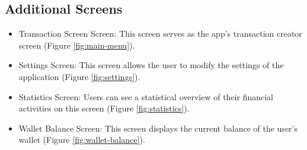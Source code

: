 \subsection{Additional Screens}

\begin{itemize}
\item Transaction Screen Screen: This screen serves as the app's transaction creator screen (Figure \ref{fig:main-menu}).
\item Settings Screen: This screen allows the user to modify the settings of the application (Figure \ref{fig:settings}).
\item Statistics Screen: Users can see a statistical overview of their financial activities on this screen (Figure \ref{fig:statistics}).
\item Wallet Balance Screen: This screen displays the current balance of the user's wallet (Figure \ref{fig:wallet-balance}).
\end{itemize}

